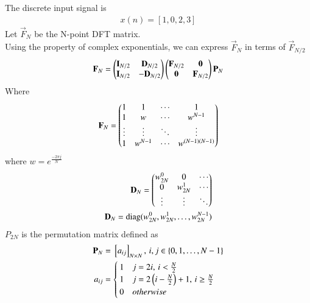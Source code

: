 \documentclass[journal,12pt,twocolumn]{IEEEtran}
\begin{document}
The discrete input signal is
\begin{align}
    x(n)=[1,0,2,3]
\end{align}
Let $\vec{F}_N$ be the N-point DFT matrix.\\
Using the property of complex exponentials, we can express $\vec{F}_N$ in terms of $\vec{F}_{N/2}$
\begin{align}
    \mathbf{F}_N=\begin{pmatrix}\mathbf{I}_{N/2} & \mathbf{D}_{N/2} \\ \mathbf{I}_{N/2} & -\mathbf{D}_{N/2}\end{pmatrix}\begin{pmatrix}\mathbf{F}_{N/2} & \mathbf{0} \\ \mathbf{0} & \mathbf{F}_{N/2}\end{pmatrix}\mathbf{P}_N
\end{align}
Where
\begin{align}
    \mathbf{F}_N=\begin{pmatrix}1 & 1 & \cdots & 1 \\ 1 & w & \cdots & w^{N-1} \\ \vdots & \vdots & \ddots & \vdots\\ 1 & w^{N-1} & \cdots & w^{(N-1)(N-1)}\end{pmatrix}
\end{align}
where $w=e^{\frac{-2\pi j}{N}}$
\begin{align}
\mathbf{D}_N=\begin{pmatrix}w_{2N}^0 & 0 & \cdots\\ 0 & w_{2N}^1 &  \cdots \\ \vdots & \vdots & \ddots \end{pmatrix}\\
\mathbf{D}_N=\text{diag}(w_{2N}^0,w_{2N}^1,\ldots,w_{2N}^{N-1})
\end{align}
$P_{2N}$ is the permutation matrix defined as 
\begin{align}
    \mathbf{P}_N&={}\left[a_{ij}\right]_{N\times N},\, i,j\in\left\{0,1,\ldots,N-1\right\}\\
	a_{ij} &=
\begin{cases}
1 & j=2i,\, i<\frac{N}{2}\\
1 &  j=2\left(i-\frac{N}{2}\right)+1,\, i\geq \frac{N}{2}\\
0 & otherwise
\end{cases}
\label{eq:final_result}
\end{align}
\end{document}
